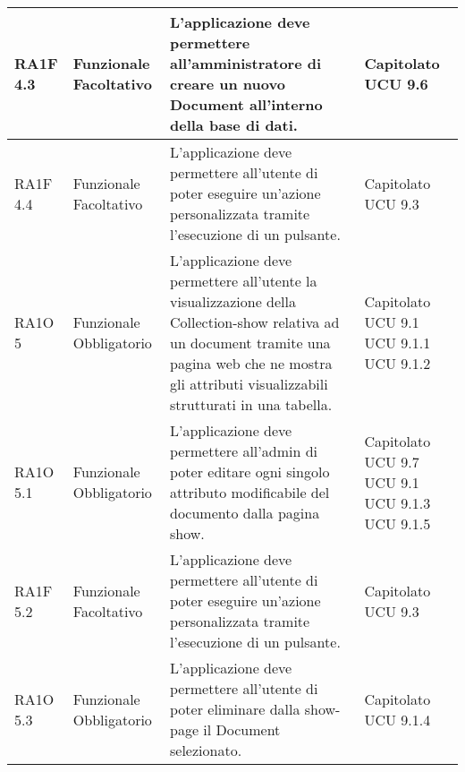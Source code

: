 \begin{center}
\begin{longtable}{ | l | p{2cm} | p{5cm} | p{1.7cm} |}
        RA1F 4.3 & Funzionale \newline  Facoltativo  & L’applicazione deve permettere all’amministratore di creare un nuovo Document all’interno della base di dati. &  Capitolato \newline  UCU 9.6 \newline  \\ \hline      
        RA1F 4.4 & Funzionale \newline  Facoltativo  & L’applicazione deve permettere all’utente di poter eseguire un’azione personalizzata tramite l’esecuzione di un pulsante. &  Capitolato \newline  UCU 9.3 \newline  \\ \hline      
        RA1O 5 & Funzionale \newline  Obbligatorio  & L'applicazione deve permettere all'utente la visualizzazione della Collection-show relativa ad un document tramite una pagina web che ne mostra gli attributi visualizzabili strutturati in una tabella. &  Capitolato \newline  UCU 9.1 \newline  UCU 9.1.1 \newline  UCU 9.1.2 \newline  \\ \hline      
        RA1O 5.1 & Funzionale \newline  Obbligatorio  & L'applicazione deve permettere all'admin di poter editare ogni singolo attributo modificabile del documento dalla pagina show. &  Capitolato \newline  UCU 9.7 \newline  UCU 9.1 \newline  UCU 9.1.3 \newline  UCU 9.1.5 \newline  \\ \hline      
        RA1F 5.2 & Funzionale \newline  Facoltativo  & L’applicazione deve permettere all’utente di poter eseguire un’azione personalizzata tramite l’esecuzione di un pulsante. &  Capitolato \newline  UCU 9.3 \newline  \\ \hline      
        RA1O 5.3 & Funzionale \newline  Obbligatorio  & L'applicazione deve permettere all'utente di poter eliminare dalla show-page il Document selezionato.
 &  Capitolato \newline  UCU 9.1.4 \newline  \\ \hline      

\end{longtable}
\end{center}
